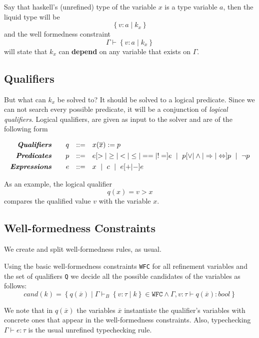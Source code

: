 \documentclass[10pt,a4paper]{article}
\newcommand\hastype[3]{\ensuremath{#1 \vdash #2 \colon #3}}
\newcommand\iswellformed[2]{\ensuremath{#1 \vdash #2}}
\newcommand\biswellformed[2]{\ensuremath{#1 \vdash_B #2}}
\begin{document}
Say that haskell's (unrefined) type of the variable $x$
is a type variable $a$, 
then the liquid type will be 
$$\left\lbrace v\colon a \mid k_x \right\rbrace$$
and the well formedness constraint
$$\iswellformed{\Gamma}{\left\lbrace v\colon a \mid k_x \right\rbrace}$$
will state that $k_x$ can \textbf{depend} on any variable that exists on $\Gamma$.


\subsection*{Qualifiers}
But what can $k_x$ be solved to?
It should be solved to a logical predicate.
Since we can not search every possible predicate, 
it will be a conjunction of \textit{logical qualifiers}.
%
Logical qualifiers,  
are given as input to the solver and are of the following form

$$
\begin{array}{rrcl}
\emphbf{Qualifiers} \quad 
  & q
  & ::= 
  &    x(\overline{x}) := p   
  \\[0.05in] 

\emphbf{Predicates} \quad 
  & p 
  & ::= 
  &      e [> | \geq | < | \leq | == | !=] e
  \spmid  p [\lor | \land | \Rightarrow | \Leftrightarrow ] p 
  \spmid \lnot p
  \\[0.05in] 

\emphbf{Expressions} \quad 
  & e
  & ::= 
  &    x \spmid c  \spmid  e [+ | -] e   
\end{array}
$$

As an example, the logical qualifier 
$$q(x) = v > x$$
compares the qualified value $v$ with the variable $x$.

\subsection*{Well-formedness Constraints}
We create and split well-formedness rules, as usual.

Using the basic well-formedness constraints \texttt{WFC} for all refinement variables 
and the set of qualifiers \texttt{Q} we decide 
all the possible candidates of the variables as follows:
$$
cand(k) = \left\lbrace 
q(\overline{x}) 
	\mid \biswellformed{\Gamma}{\left\lbrace v\colon\tau \mid k \right\rbrace}\in \texttt{WFC}
	\land \hastype{\Gamma, v:\tau}{q(\overline{x})}{bool}
\right\rbrace
$$

We note that in $q(\overline{x})$ the variables  
$\overline{x}$ instantiate the qualifier's variables with 
concrete ones that appear in the well-formedness constraints.
Also,
typechecking \hastype{\Gamma}{e}{\tau}
is the usual unrefined typechecking rule.
\end{document}
